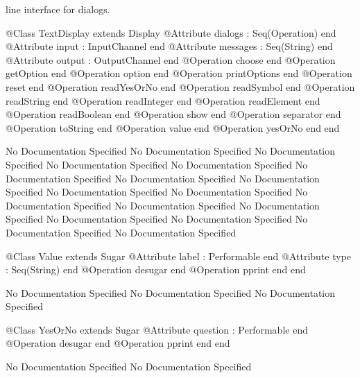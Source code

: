       line interface for dialogs.
\begin{Interface}
@Class TextDisplay extends Display
  @Attribute dialogs : Seq(Operation) end
  @Attribute input : InputChannel end
  @Attribute messages : Seq(String) end
  @Attribute output : OutputChannel end
  @Operation choose end
  @Operation getOption end
  @Operation option end
  @Operation printOptions end
  @Operation reset end
  @Operation readYesOrNo end
  @Operation readSymbol end
  @Operation readString end
  @Operation readInteger end
  @Operation readElement end
  @Operation readBoolean end
  @Operation show end
  @Operation separator end
  @Operation toString end
  @Operation value end
  @Operation yesOrNo end
end
\end{Interface}
No Documentation Specified
No Documentation Specified
No Documentation Specified
No Documentation Specified
No Documentation Specified
No Documentation Specified
No Documentation Specified
No Documentation Specified
No Documentation Specified
No Documentation Specified
No Documentation Specified
No Documentation Specified
No Documentation Specified
No Documentation Specified
No Documentation Specified
No Documentation Specified
No Documentation Specified
\begin{Interface}
@Class Value extends Sugar
  @Attribute label : Performable end
  @Attribute type : Seq(String) end
  @Operation desugar end
  @Operation pprint end
end
\end{Interface}
No Documentation Specified
No Documentation Specified
No Documentation Specified
\begin{Interface}
@Class YesOrNo extends Sugar
  @Attribute question : Performable end
  @Operation desugar end
  @Operation pprint end
end
\end{Interface}
No Documentation Specified
No Documentation Specified

